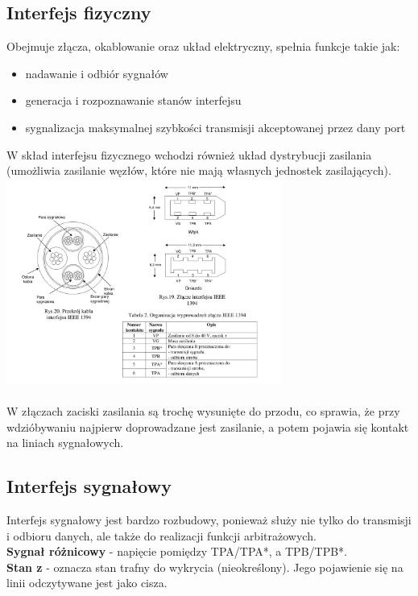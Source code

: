 \subsection{Interfejs fizyczny}
Obejmuje złącza, okablowanie  oraz układ elektryczny, spełnia funkcje takie jak:
\begin{itemize}
	\item nadawanie i odbiór sygnałów
	\item generacja i rozpoznawanie stanów interfejsu
	\item sygnalizacja maksymalnej szybkości transmisji akceptowanej przez dany port
\end{itemize}
W skład interfejsu fizycznego wchodzi również układ dystrybucji zasilania (umożliwia zasilanie węzłów, które nie mają własnych jednostek zasilających).\\
\includegraphics[width=9cm]{./wyklady/FIREWIRE_21_1.pdf}\\\\
W złączach zaciski zasilania są trochę wysunięte do przodu, co sprawia, że przy wdzióbywaniu najpierw doprowadzane jest zasilanie, a potem pojawia się kontakt na liniach sygnałowych.

\subsection{Interfejs sygnałowy}
Interfejs sygnałowy jest bardzo rozbudowy, ponieważ służy nie tylko do transmisji i odbioru danych, ale także do realizacji funkcji arbitrażowych.\\
\textbf{Sygnał różnicowy} - napięcie pomiędzy TPA/TPA*, a TPB/TPB*.\\
\textbf{Stan z} - oznacza stan trafny do wykrycia (nieokreślony). Jego pojawienie się na linii odczytywane jest jako cisza. \\

